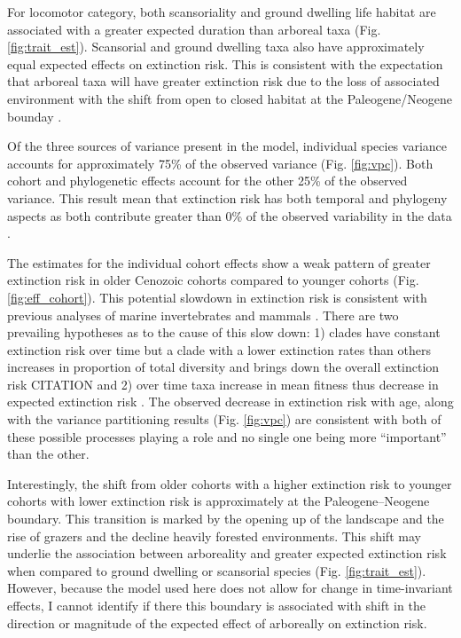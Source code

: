 \documentclass[12pt]{article}
\begin{document}
For locomotor category, both scansoriality and ground dwelling life habitat are associated with a greater expected duration than arboreal taxa (Fig. \ref{fig:trait_est}). Scansorial and ground dwelling taxa also have approximately equal expected effects on extinction risk.  This is consistent with the expectation that arboreal taxa will have greater extinction risk due to the loss of associated environment with the shift from open to closed habitat at the Paleogene/Neogene bounday \cite{Blois2009}.

Of the three sources of variance present in the model, individual species variance accounts for approximately 75\% of the observed variance (Fig. \ref{fig:vpc}). Both cohort and phylogenetic effects account for the other 25\% of the observed variance. This result mean that extinction risk has both temporal and phylogeny aspects as both contribute greater than 0\% of the observed variability in the data \cite{Housworth2004}.

The estimates for the individual cohort effects show a weak pattern of greater extinction risk in older Cenozoic cohorts compared to younger cohorts (Fig. \ref{fig:eff_cohort}). This potential slowdown in extinction risk is consistent with previous analyses of marine invertebrates \cite{Raup1982a,Foote2003} and mammals \cite{Alroy2010c,Alroy2000g}. There are two prevailing hypotheses as to the cause of this slow down: 1) clades have constant extinction risk over time but a clade with a lower extinction rates than others increases in proportion of total diversity and brings down the overall extinction risk CITATION and 2) over time taxa increase in mean fitness thus decrease in expected extinction risk \cite{Raup1982a}. The observed decrease in extinction risk with age, along with the variance partitioning results (Fig. \ref{fig:vpc}) are consistent with both of these possible processes playing a role and no single one being more ``important'' than the other.

Interestingly, the shift from older cohorts with a higher extinction risk to younger cohorts with lower extinction risk is approximately at the Paleogene--Neogene boundary. This transition is marked by the opening up of the landscape and the rise of grazers and the decline heavily forested environments. This shift may underlie the association between arboreality and greater expected extinction risk when compared to ground dwelling or scansorial species (Fig. \ref{fig:trait_est}). However, because the model used here does not allow for change in time-invariant effects, I cannot identify if there this boundary is associated with shift in the direction or magnitude of the expected effect of arboreally on extinction risk.
\end{document}
